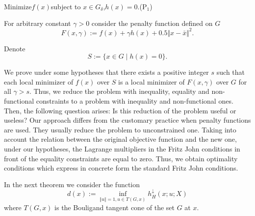 \documentclass[12pt]{article}
\def\ld#1{#1^{\downarrow}_{H}}
\newcommand{\norm}[1]{\Vert#1\Vert}
\begin{document}
\vspace{0.5cm}
\noindent
Minimize\quad $f(x)$\quad subject to \quad $x\in G_\delta$,\quad $h(x)=0$.\hfill (P$_1$)
\vspace{0.5cm}



For arbitrary constant $\gamma>0$ consider the penalty function defined on $G$
\[
F(x,\gamma):=f(x)+\gamma h(x)+0.5\norm{x-\bar x}^2.
\]

Denote
\[
S:=\{x\in G\mid h(x)=0\}.
\]

We prove under some hypotheses that there exists a positive integer $s$
such that each local minimizer of $f(x)$ over $S$ is a local minimizer of
$F(x,\gamma)$ over $G$ for all $\gamma>s$. 
Thus, we reduce the problem with inequality, equality and non-functional constraints to a problem with
inequality and non-functional ones. Then, the following question arises:
Is this reduction of the problem useful or useless? Our approach differs from
the customary practice when penalty functions are used. They usually
reduce the problem to unconstrained one. Taking into account the relation
between the original objective function and the new one, under our hypotheses,
the Lagrange multipliers in the Fritz John conditions in front of the
equality constraints are equal to zero. Thus, we obtain optimality conditions
which express in concrete form the standard Fritz John conditions.

In the next theorem we consider the function
\[
d(x):=\inf_{\norm{u}=1, u\in T(G,x)}\ld h(x;u;X)
\]
where $T(G,x)$ is the Bouligand tangent cone of the set $G$ at $x$.
\end{document}
